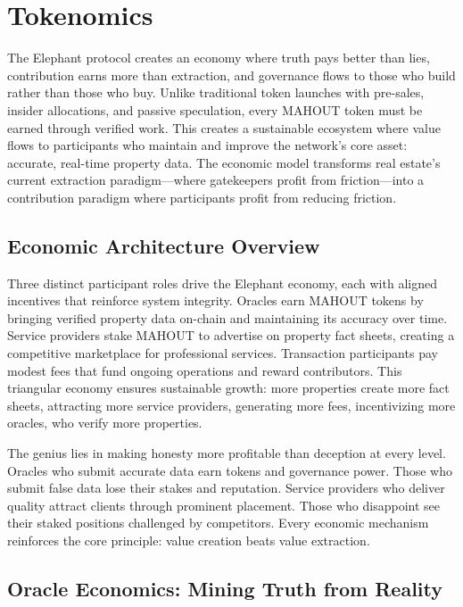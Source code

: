 \chapter{Tokenomics}

The Elephant protocol creates an economy where truth pays better than lies, contribution earns more than extraction, and governance flows to those who build rather than those who buy. Unlike traditional token launches with pre-sales, insider allocations, and passive speculation, every MAHOUT token must be earned through verified work. This creates a sustainable ecosystem where value flows to participants who maintain and improve the network's core asset: accurate, real-time property data. The economic model transforms real estate's current extraction paradigm—where gatekeepers profit from friction—into a contribution paradigm where participants profit from reducing friction.

\section{Economic Architecture Overview}

Three distinct participant roles drive the Elephant economy, each with aligned incentives that reinforce system integrity. Oracles earn MAHOUT tokens by bringing verified property data on-chain and maintaining its accuracy over time. Service providers stake MAHOUT to advertise on property fact sheets, creating a competitive marketplace for professional services. Transaction participants pay modest fees that fund ongoing operations and reward contributors. This triangular economy ensures sustainable growth: more properties create more fact sheets, attracting more service providers, generating more fees, incentivizing more oracles, who verify more properties.

The genius lies in making honesty more profitable than deception at every level. Oracles who submit accurate data earn tokens and governance power. Those who submit false data lose their stakes and reputation. Service providers who deliver quality attract clients through prominent placement. Those who disappoint see their staked positions challenged by competitors. Every economic mechanism reinforces the core principle: value creation beats value extraction.

\section{Oracle Economics: Mining Truth from Reality}


